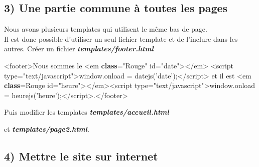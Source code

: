\documentclass{article}
\newenvironment{Shaded}{}{}
\newcommand{\KeywordTok}[1]{\textcolor[rgb]{0.00,0.44,0.13}{\textbf{{#1}}}}
\newcommand{\DataTypeTok}[1]{\textcolor[rgb]{0.56,0.13,0.00}{{#1}}}
\newcommand{\StringTok}[1]{\textcolor[rgb]{0.25,0.44,0.63}{{#1}}}
\newcommand{\NormalTok}[1]{{#1}}
\begin{document}
    \subsection{3) Une partie commune à toutes les
pages}\label{une-partie-commune-uxe0-toutes-les-pages}

Nous avons plusieurs templates qui utilisent le même bas de page.\\Il
est donc possible d'utiliser un seul fichier template et de l'inclure
dans les autres. Créer un fichier \textbf{\emph{templates/footer.html}}

\begin{Shaded}
\begin{Highlighting}[]
\NormalTok{<footer>Nous sommes le <em }\KeywordTok{class}\NormalTok{=}\StringTok{"Rouge"} \DataTypeTok{id}\NormalTok{=}\StringTok{"date"}\NormalTok{></em> <script }\DataTypeTok{type}\NormalTok{=}\StringTok{"text/javascript"}\NormalTok{>window.onload = datejs(}\StringTok{'date'}\NormalTok{);</script> et il est <em }\KeywordTok{class}\NormalTok{=Rouge }\DataTypeTok{id}\NormalTok{=}\StringTok{"heure"}\NormalTok{></em><script }\DataTypeTok{type}\NormalTok{=}\StringTok{"text/javascript"}\NormalTok{>window.onload = heurejs(}\StringTok{'heure'}\NormalTok{);</script>.</footer>}
\end{Highlighting}
\end{Shaded}

Puis modifier les templates \textbf{\emph{templates/accueil.html}}

\begin{Shaded}
\end{Shaded}

et \textbf{\emph{templates/page2.html}}.

\begin{Shaded}
\end{Shaded}

    \subsection{4) Mettre le site sur
internet}\label{mettre-le-site-sur-internet}
\end{document}
